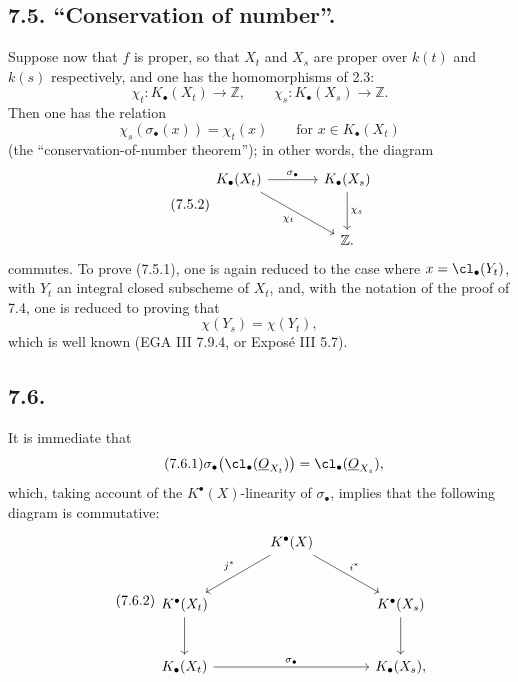\subsection*{7.5. ``Conservation of number''.}
Suppose now that \(f\) is proper, so that \(X_t\) and \(X_s\) are proper over \(k(t)\) and \(k(s)\) respectively, and one has the homomorphisms of 2.3:
\[
  \chi_t:K_\bullet(X_t)\longrightarrow \mathbb Z,\qquad
  \chi_s:K_\bullet(X_s)\longrightarrow \mathbb Z .
\]
Then one has the relation
\begin{equation}\tag{7.5.1}
  \chi_s(\sigma_\bullet(x))=\chi_t(x)\qquad\text{for } x\in K_\bullet(X_t)
\end{equation}
(the ``conservation-of-number theorem''); in other words, the diagram
\begin{equation}\tag{7.5.2}
\begin{tikzcd}[column sep=large,row sep=large]
K_\bullet(X_t) \arrow[r,"\sigma_\bullet"] \arrow[dr,"\chi_t"'] &
K_\bullet(X_s) \arrow[d,"\chi_s"]\\
& \mathbb Z .
\end{tikzcd}
\end{equation}
commutes. To prove (7.5.1), one is again reduced to the case where \(x=\cl_\bullet(Y_t)\), with \(Y_t\) an integral closed subscheme of \(X_t\), and, with the notation of the proof of 7.4, one is reduced to proving that
\[
  \chi(Y_s)=\chi(Y_t),
\]
which is well known (EGA III 7.9.4, or Exposé III 5.7).

\subsection*{7.6.}
It is immediate that
\begin{equation}\tag{7.6.1}
  \sigma_\bullet\bigl(\cl_\bullet(\underline{O}_{X_t})\bigr)=\cl_\bullet(\underline{O}_{X_s}),
\end{equation}
which, taking account of the \(K^{\bullet}(X)\)-linearity of \(\sigma_\bullet\), implies that the following diagram is commutative:
\begin{equation}\tag{7.6.2}
\begin{tikzcd}[column sep=large,row sep=large]
& K^{\bullet}(X) \arrow[dl,"j^*"'] \arrow[dr,"i^*"] &\\
K^{\bullet}(X_t) \arrow[d] && K^{\bullet}(X_s) \arrow[d]\\
K_\bullet(X_t) \arrow[rr,"\sigma_\bullet"] && K_\bullet(X_s),
\end{tikzcd}
\end{equation}
